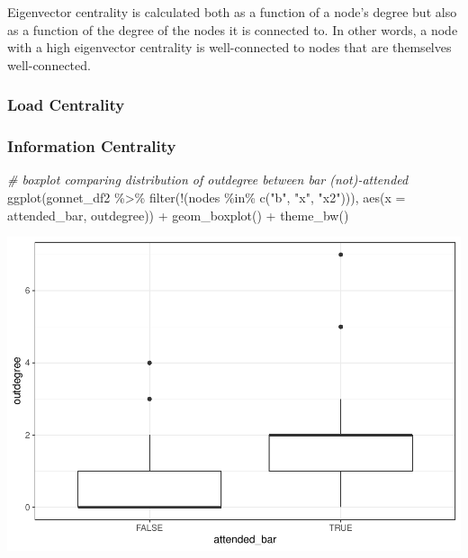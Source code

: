 \documentclass[12pt]{article}
\newenvironment{Shaded}{\begin{snugshade}}{\end{snugshade}}
\newcommand{\AttributeTok}[1]{\textcolor[rgb]{0.77,0.63,0.00}{#1}}
\newcommand{\CommentTok}[1]{\textcolor[rgb]{0.56,0.35,0.01}{\textit{#1}}}
\newcommand{\FunctionTok}[1]{\textcolor[rgb]{0.00,0.00,0.00}{#1}}
\newcommand{\NormalTok}[1]{#1}
\newcommand{\SpecialCharTok}[1]{\textcolor[rgb]{0.00,0.00,0.00}{#1}}
\newcommand{\StringTok}[1]{\textcolor[rgb]{0.31,0.60,0.02}{#1}}
\begin{document}
Eigenvector centrality is calculated both as a function of a node's degree but also as a function of the degree of the nodes it is connected to. In other words, a node with a high eigenvector centrality is well-connected to nodes that are themselves well-connected.

\hypertarget{load-centrality}{%
\subsubsection{Load Centrality}\label{load-centrality}}

\hypertarget{information-centrality}{%
\subsubsection{Information Centrality}\label{information-centrality}}

\begin{Shaded}
\begin{Highlighting}[]
\CommentTok{\# boxplot comparing distribution of outdegree between bar (not){-}attended}
\FunctionTok{ggplot}\NormalTok{(gonnet\_df2 }\SpecialCharTok{\%\textgreater{}\%} \FunctionTok{filter}\NormalTok{(}\SpecialCharTok{!}\NormalTok{(nodes }\SpecialCharTok{\%in\%} \FunctionTok{c}\NormalTok{(}\StringTok{"b"}\NormalTok{, }\StringTok{"x"}\NormalTok{, }\StringTok{"x2"}\NormalTok{))), }
       \FunctionTok{aes}\NormalTok{(}\AttributeTok{x =}\NormalTok{ attended\_bar, outdegree)) }\SpecialCharTok{+} 
  \FunctionTok{geom\_boxplot}\NormalTok{() }\SpecialCharTok{+} \FunctionTok{theme\_bw}\NormalTok{()}
\end{Highlighting}
\end{Shaded}

\includegraphics{JStevenRaquel-paper_files/figure-latex/bar-attendance-outdegree-1.pdf}
\end{document}
